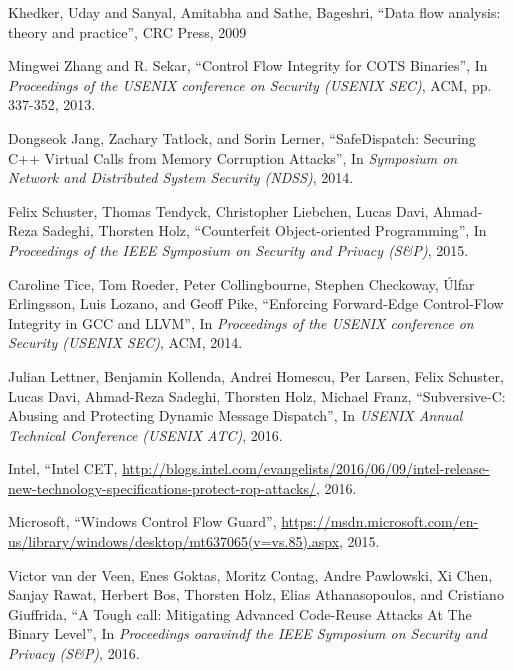 \documentclass[11pt,a4paper,bibtotoc,idxtotoc,headsepline,footsepline,footexclude,BCOR20mm,DIV10]{scrbook}
\begin{document}
\begin{thebibliography}{50}



Khedker, Uday and Sanyal, Amitabha and Sathe, Bageshri,
``{Data flow analysis: theory and practice}'',
CRC Press, 2009

Mingwei Zhang and R. Sekar,
``{Control Flow Integrity for COTS Binaries}'', In
\emph{Proceedings of the USENIX conference on Security (USENIX SEC)}, ACM, pp. 337-352, 2013.

Dongseok Jang, Zachary Tatlock, and Sorin Lerner,
``{SafeDispatch: Securing C++ Virtual Calls from Memory Corruption Attacks}'', In
\emph{Symposium on Network and Distributed System Security (NDSS)}, 2014.

Felix Schuster, Thomas Tendyck, Christopher Liebchen, Lucas Davi, Ahmad-Reza Sadeghi, Thorsten Holz, 
``{Counterfeit Object-oriented Programming}'', In
\emph{Proceedings of the IEEE Symposium on Security and Privacy (S\&P)}, 2015.

Caroline Tice, Tom Roeder, Peter Collingbourne, Stephen Checkoway, 
Úlfar Erlingsson, Luis Lozano, and Geoff Pike, 
``{Enforcing Forward-Edge Control-Flow Integrity in GCC and LLVM}'', In
\emph{Proceedings of the USENIX conference on Security (USENIX SEC)}, ACM, 2014.

Julian Lettner, Benjamin Kollenda, Andrei Homescu, Per Larsen, Felix Schuster,
Lucas Davi, Ahmad-Reza Sadeghi, Thorsten Holz, Michael Franz,
``{Subversive-C: Abusing and Protecting Dynamic Message Dispatch}'', In
\emph{USENIX Annual Technical Conference (USENIX ATC)}, 2016.

Intel, ``{Intel CET},
\url{http://blogs.intel.com/evangelists/2016/06/09/intel-release-new-technology-specifications-protect-rop-attacks/}, 2016.

Microsoft,
``{Windows Control Flow Guard}'',
\url{https://msdn.microsoft.com/en-us/library/windows/desktop/mt637065(v=vs.85).aspx}, 2015.

Victor van der Veen, Enes Goktas, Moritz Contag, Andre Pawlowski, Xi Chen, Sanjay Rawat, 
Herbert Bos, Thorsten Holz, Elias Athanasopoulos, and Cristiano Giuffrida,
``{A Tough call: Mitigating Advanced Code-Reuse Attacks At The Binary Level}'', In
\emph{Proceedings oaravindf the IEEE Symposium on Security and Privacy (S\&P)}, 2016.


\end{thebibliography}
\end{document}
